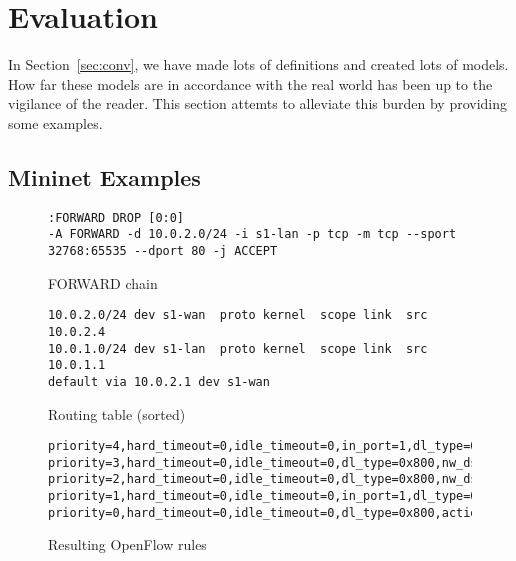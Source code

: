 \section{Evaluation}\label{sec:eval}
In Section~\ref{sec:conv}, we have made lots of definitions and created lots of models.
How far these models are in accordance with the real world has been up to the vigilance of the reader.
This section attemts to alleviate this burden by providing some examples.

\subsection{Mininet Examples}
\label{sec:mnex}
\begin{figure*}
\centering
\begin{subfigure}[b]{0.45\textwidth}
\begin{lstlisting}
:FORWARD DROP [0:0]
-A FORWARD -d 10.0.2.0/24 -i s1-lan -p tcp -m tcp --sport 32768:65535 --dport 80 -j ACCEPT
\end{lstlisting}
\caption{FORWARD chain}
\end{subfigure}
\hspace{0.05\textwidth}
\begin{subfigure}[b]{0.45\textwidth}
\begin{lstlisting}
10.0.2.0/24 dev s1-wan  proto kernel  scope link  src 10.0.2.4
10.0.1.0/24 dev s1-lan  proto kernel  scope link  src 10.0.1.1
default via 10.0.2.1 dev s1-wan
\end{lstlisting}
\caption{Routing table (sorted)}
\end{subfigure}
\begin{subfigure}{\textwidth}
\begin{lstlisting}
priority=4,hard_timeout=0,idle_timeout=0,in_port=1,dl_type=0x800,nw_proto=6,nw_dst=10.0.2.0/24,tp_src=32768/0x8000,tp_dst=80,action=output:2
priority=3,hard_timeout=0,idle_timeout=0,dl_type=0x800,nw_dst=10.0.2.0/24,action=drop
priority=2,hard_timeout=0,idle_timeout=0,dl_type=0x800,nw_dst=10.0.1.0/24,action=drop
priority=1,hard_timeout=0,idle_timeout=0,in_port=1,dl_type=0x800,nw_proto=6,nw_dst=10.0.2.0/24,tp_src=32768/0x8000,tp_dst=80,action=output:2
priority=0,hard_timeout=0,idle_timeout=0,dl_type=0x800,action=drop
\end{lstlisting}
\caption{Resulting OpenFlow rules}
\end{subfigure}
\caption{Example Network 1 -- Configuration}
\label{fig:exn1}
\end{figure*}
